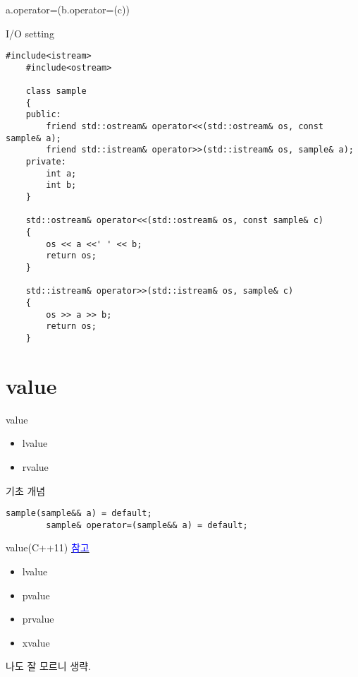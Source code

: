 \documentclass[10pt]{beamer}
\begin{document}
\begin{frame}
    a.operator=(b.operator=(c))

\end{frame}




\begin{frame}[fragile]{I/O setting}
    \begin{lstlisting}[style = CppStyle]
    #include<istream>
    #include<ostream>

    class sample
    {
    public:
        friend std::ostream& operator<<(std::ostream& os, const sample& a);
        friend std::istream& operator>>(std::istream& os, sample& a);
    private:
        int a;
        int b; 
    }
        
    std::ostream& operator<<(std::ostream& os, const sample& c)
    {
        os << a <<' ' << b;
        return os;
    }

    std::istream& operator>>(std::istream& os, sample& c)
    {
        os >> a >> b;
        return os;
    }
    \end{lstlisting}
\end{frame}    

\section{value}

\begin{frame}{value}
    \begin{itemize}
        \item lvalue
        \item rvalue
    \end{itemize}
\end{frame}


\begin{frame}[fragile]{기초 개념}
    \begin{lstlisting}[style = CppStyle]
        sample(sample&& a) = default;
        sample& operator=(sample&& a) = default;
    \end{lstlisting}
\end{frame}

\begin{frame}{value(C++11)}
    \href{https://en.cppreference.com/w/cpp/language/value_category}{\textcolor{blue}{참고}}
    
    \begin{itemize}
        \item lvalue
        \item pvalue
        \item prvalue
        \item xvalue
    \end{itemize}

    나도 잘 모르니 생략.
\end{frame}
\end{document}
